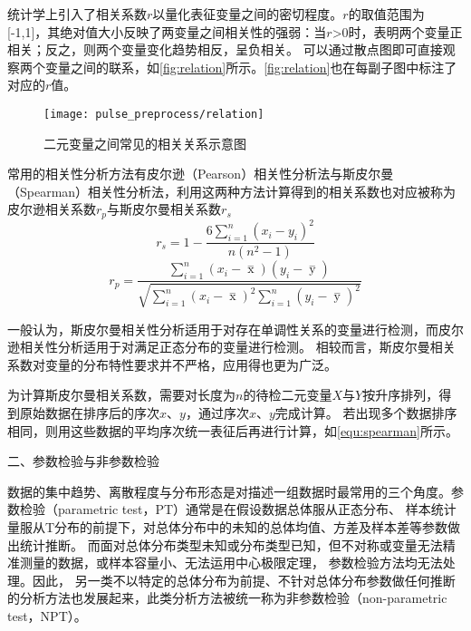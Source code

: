 统计学上引入了相关系数$r$以量化表征变量之间的密切程度。$r$的取值范围为[-1,1]，其绝对值大小反映了两变量之间相关性的强弱：当$r$>0时，表明两个变量正相关；反之，则两个变量变化趋势相反，呈负相关。
可以通过散点图即可直接观察两个变量之间的联系，如\autoref{fig:relation}所示。\autoref{fig:relation}也在每副子图中标注了对应的$r$值。

\begin{figure}[htbp]
    \centering
    \texttt{[image: pulse\_preprocess/relation]}
    \caption[二元变量之间常见的相关关系示意图]{\label{fig:relation}二元变量之间常见的相关关系示意图\cite{IXL2022}}
\end{figure}

常用的相关性分析方法有皮尔逊（Pearson）相关性分析法与斯皮尔曼（Spearman）相关性分析法，利用这两种方法计算得到的相关系数也对应被称为皮尔逊相关系数$r_p$与斯皮尔曼相关系数$r_s$
\begin{equation}
    \label{equ:spearman}
    r_s=1-\frac{6\sum_{i=1}^{n}(x_{i}-y_{i})^2}{n(n^2-1)}
\end{equation}
\begin{equation}
    \label{equ:pearson}
    r_p=\frac{\sum_{i=1}^n{(x_i- \mathop{x} \limits^-)(y_i- \mathop{y} \limits^-)}}{\sqrt{{\sum_{i=1}^n}{{(x_i- \mathop{x} \limits^-)^2\sum_{i=1}^n}{(y_i- \mathop{y} \limits^-)^2}}}}
\end{equation}

一般认为，斯皮尔曼相关性分析适用于对存在单调性关系的变量进行检测，而皮尔逊相关性分析适用于对满足正态分布的变量进行检测。
相较而言，斯皮尔曼相关系数对变量的分布特性要求并不严格，应用得也更为广泛。

为计算斯皮尔曼相关系数，需要对长度为$n$的待检二元变量$X$与$Y$按升序排列，得到原始数据在排序后的序次$x$、$y$，通过序次$x$、$y$完成计算。
若出现多个数据排序相同，则用这些数据的平均序次统一表征后再进行计算，如\autoref{equ:spearman}所示。

二、参数检验与非参数检验

数据的集中趋势、离散程度与分布形态是对描述一组数据时最常用的三个角度\cite{Hu2021}。参数检验（parametric test，PT）通常是在假设数据总体服从正态分布、
样本统计量服从T分布的前提下，对总体分布中的未知的总体均值、方差及样本差等参数做出统计推断。
而面对总体分布类型未知或分布类型已知，但不对称或变量无法精准测量的数据，或样本容量小、无法运用中心极限定理，
参数检验方法均无法处理。因此，
另一类不以特定的总体分布为前提、不针对总体分布参数做任何推断的分析方法也发展起来，此类分析方法被统一称为非参数检验（non-parametric test，NPT）\cite{Guo2017,Hu2021,Zhang2019}。


